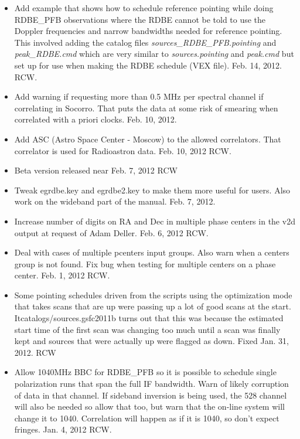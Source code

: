 \documentclass{report}
\begin{document}
\begin{itemize}

\item Add example 
that shows how to schedule reference pointing while doing RDBE\_PFB observations
where the RDBE cannot be told to use the Doppler frequencies and narrow 
bandwidths needed for reference pointing.  This involved adding the catalog files
{\sl sources\_RDBE\_PFB.pointing} and {\sl peak\_RDBE.cmd} which are very 
similar to {\sl sources.pointing} and {\sl peak.cmd} but set up for use when
making the RDBE schedule (VEX file).  Feb. 14, 2012.  RCW.

\item Add warning if requesting more than 0.5 MHz per spectral channel
if correlating in Socorro.  That puts the  data at some risk of smearing
when correlated with a priori clocks.  Feb. 10, 2012.

\item Add ASC (Astro Space Center - Moscow) to the allowed correlators.
That correlator is used for Radioastron data.  Feb. 10, 2012  RCW.

\item Beta version released near Feb. 7, 2012  RCW

\item Tweak egrdbe.key and egrdbe2.key to make them more useful for
users.  Also work on the wideband part of the manual.  Feb. 7, 2012.

\item Increase number of digits on RA and Dec in multiple phase centers
in the v2d output at request of Adam Deller.  Feb. 6, 2012 RCW.

\item Deal with cases of multiple pcenters input groups.  Also warn when
a centers group is not found.  Fix bug when testing for multiple centers
on a phase center.  Feb. 1, 2012  RCW.

\item Some pointing schedules driven from the scripts using the optimization
mode that takes scans that are up were passing up a lot of good scans at the
start.  Itcatalogs/sources.gsfc2011b turns out that this was because the estimated start time of
the first scan was changing too much until a scan was finally kept and 
sources that were actually up were flagged as down.  Fixed Jan. 31, 2012.  RCW

\item Allow 1040MHz BBC for RDBE\_PFB so it is possible to schedule
single polarization runs that span the full IF bandwidth.  Warn
of likely corruption of data in that channel.  If sideband inversion
is being used, the 528 channel will also be needed so allow that too,
but warn that the on-line system will change it to 1040.  Correlation
will happen as if it is 1040, so don't expect fringes.  Jan. 4, 2012 RCW.


\end{itemize}
\end{document}
